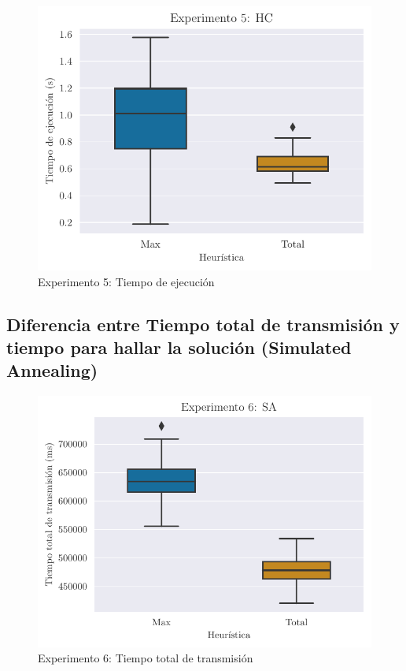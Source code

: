 \begin{figure}[H]
    \centering
    \includegraphics{include/plots/ex5_time_bplot.pdf}
    \caption{Experimento 5: Tiempo de ejecución}%
    \label{fig:ex5ttt}
\end{figure}

\subsection{Diferencia entre Tiempo total de transmisión y tiempo para hallar la solución (Simulated Annealing)}

\begin{figure}[H]
    \centering
    \includegraphics{include/plots/ex6_ttt_bplot.pdf}
    \caption{Experimento 6: Tiempo total de transmisión}%
    \label{fig:ex5ttt}
\end{figure}

